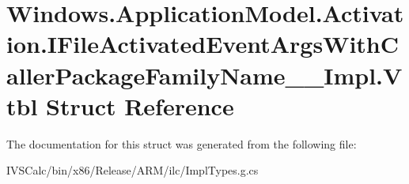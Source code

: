 \hypertarget{struct_windows_1_1_application_model_1_1_activation_1_1_i_file_activated_event_args_with_caller_7b0a0cff4f6bceda01476892b8cecc12}{}\section{Windows.\+Application\+Model.\+Activation.\+I\+File\+Activated\+Event\+Args\+With\+Caller\+Package\+Family\+Name\+\_\+\+\_\+\+Impl.\+Vtbl Struct Reference}
\label{struct_windows_1_1_application_model_1_1_activation_1_1_i_file_activated_event_args_with_caller_7b0a0cff4f6bceda01476892b8cecc12}


The documentation for this struct was generated from the following file\+:\begin{DoxyCompactItemize}
\item 
I\+V\+S\+Calc/bin/x86/\+Release/\+A\+R\+M/ilc/Impl\+Types.\+g.\+cs\end{DoxyCompactItemize}
